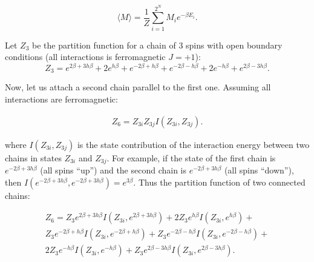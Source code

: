 \documentclass[preprint,12pt]{elsarticle}
\begin{document}
	\begin{equation}
		\langle M \rangle = \frac{1}{Z} \sum_{i = 1}^{2^N} M_i e^{-\beta E_i}.
		\label{magnetization}
	\end{equation}
	
	Let $Z_3$ be the partition function for a chain of 3 spins with open boundary conditions (all interactions is ferromagnetic $J = +1$):
		\begin{equation}
		Z_3 = e^{2\beta + 3h\beta} + 2e^{h\beta} + e^{- 2\beta + h\beta } + e^{- 2\beta -h\beta}  + 2e^{-h\beta} + e^{2\beta - 3h\beta}.
		\label{eq:stat_3}
	\end{equation}

	Now, let us attach a second chain parallel to the first one. Assuming all interactions are ferromagnetic:
	
	\begin{equation}
		\label{eq:stat_z3}
		\begin{alignedat}{2}
			Z_6 =  Z_{3i}Z_{3j}I(Z_{3i},Z_{3j}).
		\end{alignedat}
	\end{equation}

	\noindent where $I(Z_{3i},Z_{3j})$ is the state contribution of the interaction energy between two chains in states $Z_{3i}$ and $Z_{3j}$. For example, if the state of the first chain is $e^{-2\beta+3h\beta}$ (all spins ``up'') and the second chain is $e^{-2\beta+3h\beta}$ (all spins ``down''), then $I(e^{-2\beta+3h\beta}, e^{-2\beta+3h\beta})=e^{3\beta}$. Thus the partition function of two connected chains:
	
		\begin{equation}
			\label{eq:stat_6}
			\begin{alignedat}{3}
			Z_6 = Z_{3}e^{2\beta + 3h\beta}I(Z_{3i}, e^{2\beta + 3h\beta}) + 2Z_{3}e^{h\beta}I(Z_{3i}, e^{h\beta}) + \\
			Z_{3}e^{- 2\beta + h\beta }I(Z_{3i}, e^{- 2\beta + h\beta }) + Z_{3}e^{- 2\beta -h\beta}I(Z_{3i}, e^{- 2\beta -h\beta})  + \\
			2Z_{3}e^{-h\beta}I(Z_{3i}, e^{-h\beta}) + Z_{3}e^{2\beta - 3h\beta}I(Z_{3i}, e^{2\beta - 3h\beta}).
			\end{alignedat}
		\end{equation}
	
\end{document}
